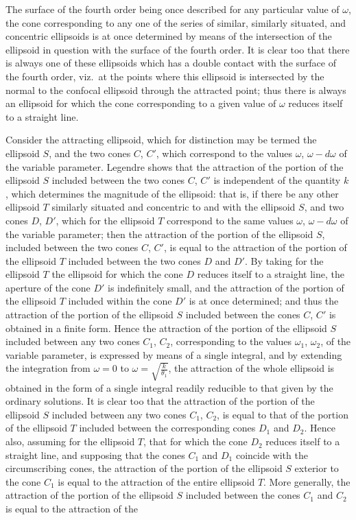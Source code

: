 \documentclass[11pt,a4paper]{book}
\begin{document}
\newpage

\setcounter{page}{434}

The surface of the fourth order being once described for any particular value of $\omega$, the cone corresponding to any one of the series of similar, similarly situated, and concentric ellipsoids is at once determined by means of the intersection of the ellipsoid in question with the surface of the fourth order. It is clear too that there is always one of these ellipsoids which has a double contact with the surface of the fourth order, viz.\ at the points where this ellipsoid is intersected by the normal to the confocal ellipsoid through the attracted point; thus there is always an ellipsoid for which the cone corresponding to a given value of $\omega$ reduces itself to a straight line.

Consider the attracting ellipsoid, which for distinction may be termed the ellipsoid $S$, and the two cones $C$, $C'$, which correspond to the values $\omega$, $\omega - d\omega$ of the variable parameter. Legendre shows that the attraction of the portion of the ellipsoid $S$ included between the two cones $C$, $C'$ is independent of the quantity $k$, which determines the magnitude of the ellipsoid: that is, if there be any other ellipsoid $T$ similarly situated and concentric to and with the ellipsoid $S$, and two cones $D$, $D'$, which for the ellipsoid $T$ correspond to the same values $\omega$, $\omega - d\omega$ of the variable parameter; then the attraction of the portion of the ellipsoid $S$, included between the two cones $C$, $C'$, is equal to the attraction of the portion of the ellipsoid $T$ included between the two cones $D$ and $D'$. By taking for the ellipsoid $T$ the ellipsoid for which the cone $D$ reduces itself to a straight line, the aperture of the cone $D'$ is indefinitely small, and the attraction of the portion of the ellipsoid $T$ included within the cone $D'$ is at once determined; and thus the attraction of the portion of the ellipsoid $S$ included between the cones $C$, $C'$ is obtained in a finite form. Hence the attraction of the portion of the ellipsoid $S$ included between any two cones $C_{1}$, $C_{2}$, corresponding to the values $\omega_{1}$, $\omega_{2}$, of the variable parameter, is expressed by means of a single integral, and by extending the integration from $\omega = 0$ to $\omega = \sqrt{\frac{k}{\theta_{1}}}$, the attraction of the whole ellipsoid is obtained in the form of a single integral readily reducible to that given by the ordinary solutions. It is clear too that the attraction of the portion of the ellipsoid $S$ included between any two cones $C_{1}$, $C_{2}$, is equal to that of the portion of the ellipsoid $T$ included between the corresponding cones $D_{1}$ and $D_{2}$. Hence also, assuming for the ellipsoid $T$, that for which the cone $D_{2}$ reduces itself to a straight line, and supposing that the cones $C_{1}$ and $D_{1}$ coincide with the circumscribing cones, the attraction of the portion of the ellipsoid $S$ exterior to the cone $C_{1}$ is equal to the attraction of the entire ellipsoid $T$. More generally, the attraction of the portion of the ellipsoid $S$ included between the cones $C_{1}$ and $C_{2}$ is equal to the attraction of the 
\end{document}

